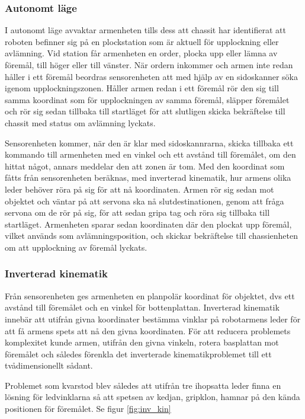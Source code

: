 \subsubsection{Autonomt läge}

I autonomt läge avvaktar armenheten tills dess att chassit har identifierat att roboten befinner sig på en plockstation som är aktuell för upplockning eller avlämning. Vid station får armenheten en order, plocka upp eller lämna av föremål, till höger eller till vänster. När ordern inkommer och armen inte redan håller i ett föremål beordras sensorenheten att med hjälp av en sidoskanner söka igenom upplockningszonen. Håller armen redan i ett föremål rör den sig till samma koordinat som för upplockningen av samma föremål, släpper föremålet och rör sig sedan tillbaka till startläget för att slutligen skicka bekräftelse till chassit med status om avlämning lyckats.

Sensorenheten kommer, när den är klar med sidoskannrarna, skicka tillbaka ett kommando till armenheten med en vinkel och ett avstånd till föremålet, om den hittat något, annars meddelar den att zonen är tom. Med den koordinat som fåtts från sensorenheten beräknas, med inverterad kinematik, hur armens olika leder behöver röra på sig för att nå koordinaten. Armen rör sig sedan mot objektet och väntar på att servona ska nå slutdestinationen, genom att fråga servona om de rör på sig, för att sedan gripa tag och röra sig tillbaka till startläget. Armenheten sparar sedan koordinaten där den plockat upp föremål, vilket används som avlämningsposition, och skickar bekräftelse till chassienheten om att upplockning av föremål lyckats. 

\subsubsection{Inverterad kinematik}
\label{inverskinematik}

Från sensorenheten ges armenheten en planpolär koordinat för objektet, dvs ett avstånd till föremålet och en vinkel för bottenplattan. Inverterad kinematik innebär att utifrån givna koordinater bestämma vinklar på robotarmens leder för att få armens spets att nå den givna koordinaten. För att reducera problemets komplexitet kunde armen, utifrån den givna vinkeln, rotera basplattan mot föremålet och således förenkla det inverterade kinematikproblemet till ett tvådimensionellt sådant.

Problemet som kvarstod blev således att utifrån tre ihopsatta leder finna en lösning för ledvinklarna så att spetsen av kedjan, gripklon, hamnar på den kända positionen för föremålet. Se figur \ref{fig:inv_kin}

